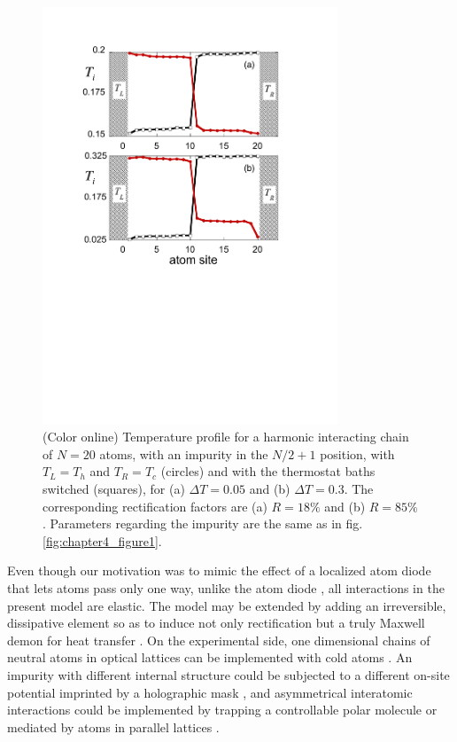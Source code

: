 \begin{figure}
\centering
\includegraphics[width=8.8cm]{Figures/FIG6.pdf}
\caption{(Color online) Temperature profile for a harmonic interacting chain of $N=20$ atoms, with an impurity in the $N/2+1$ position, with $T_L=T_h$ and $T_R=T_c$ (circles) and with the thermostat baths switched (squares), for (a) $\Delta T = 0.05$ and (b)  $\Delta T = 0.3$. The corresponding rectification factors are (a) $R=18\%$ and (b) $R=85\%$. Parameters regarding the impurity are the same as in fig. \ref{fig:chapter4_figure1}.
}
\label{fig:chapter4_figure6}
\end{figure}

Even though our motivation was to mimic the effect of a localized atom diode that lets atoms pass only one way,
unlike the atom diode \cite{Ruschhaupt2004}, all interactions in the present model
are elastic. The model may be extended by adding an irreversible,  dissipative element so as to induce not only rectification but a truly Maxwell demon for heat transfer \cite{Skordos1992,Ruschhaupt2006}.
On the experimental side, one dimensional chains of neutral atoms in optical lattices can be implemented with cold atoms \cite{Bloch2005}.
An impurity with different internal structure could be subjected to a different on-site potential imprinted by a holographic mask \cite{Bakr2009}, and asymmetrical interatomic interactions
could be implemented by trapping a controllable polar molecule or mediated by atoms in parallel lattices \cite{Gollub2014}.
